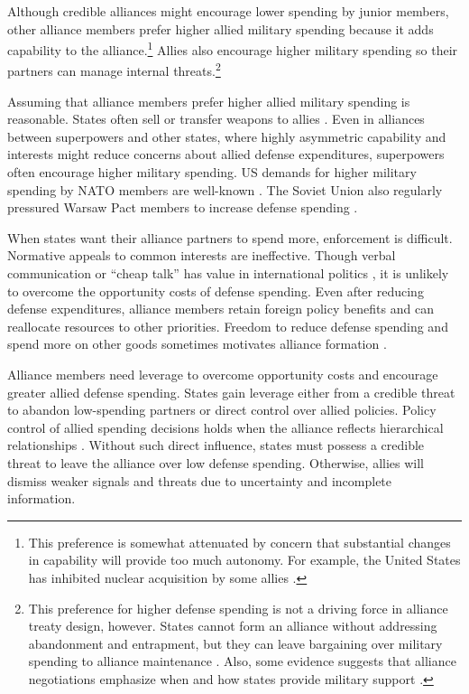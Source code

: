 \documentclass[12pt]{article}
\begin{document}
Although credible alliances might encourage lower spending by junior members, other alliance members prefer higher allied military spending because it adds capability to the alliance.\footnote{This preference is somewhat attenuated by concern that substantial changes in capability will provide too much autonomy. For example, the United States has inhibited nuclear acquisition by some allies \citep{Gavin2015, Lanoszka2015}.}
Allies also encourage higher military spending so their partners can manage internal threats.\footnote{
This preference for higher defense spending is not a driving force in alliance treaty design, however.
States cannot form an alliance without addressing abandonment and entrapment, but they can leave bargaining over military spending to alliance maintenance \citep{Snyder1997}.
Also, some evidence suggests that alliance negotiations emphasize when and how states provide military support \citep{Poast2019a}.} 


Assuming that alliance members prefer higher allied military spending is reasonable. 
States often sell or transfer weapons to allies \citep{Yarhi-Miloetal2016, Pampetal2018}. 
Even in alliances between superpowers and other states, where highly asymmetric capability and interests might reduce concerns about allied defense expenditures, superpowers often encourage higher military spending. 
US demands for higher military spending by NATO members are well-known \citep{SchuesslerShifrinson2019}.
The Soviet Union also regularly pressured Warsaw Pact members to increase defense spending \citep{Simon1985}. 


When states want their alliance partners to spend more, enforcement is difficult. 
Normative appeals to common interests are ineffective. 
Though verbal communication or ``cheap talk'' has value in international politics \citep{Trager2010}, it is unlikely to overcome the opportunity costs of defense spending. 
Even after reducing defense expenditures, alliance members retain foreign policy benefits and can reallocate resources to other priorities. 
Freedom to reduce defense spending and spend more on other goods sometimes motivates alliance formation \citep{Kimball2010, AllenDigiuseppe2013}. 


Alliance members need leverage to overcome opportunity costs and encourage greater allied defense spending. 
States gain leverage either from a credible threat to abandon low-spending partners or direct control over allied policies. 
Policy control of allied spending decisions holds when the alliance reflects hierarchical relationships \citep{Lake1996}. 
Without such direct influence, states must possess a credible threat to leave the alliance over low defense spending. 
Otherwise, allies will dismiss weaker signals and threats due to uncertainty and incomplete information. 
\end{document}
